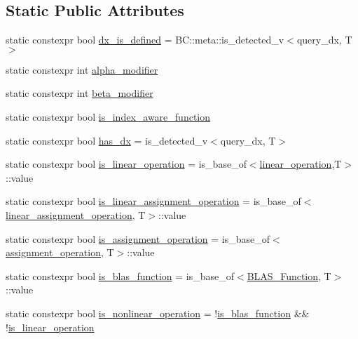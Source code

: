 \subsection*{Static Public Attributes}
\begin{DoxyCompactItemize}
\item 
static constexpr bool \hyperlink{structBC_1_1oper_1_1operation__traits_a6e6485639213a9e1ea200b332d7cfa1e}{dx\+\_\+is\+\_\+defined} = B\+C\+::meta\+::is\+\_\+detected\+\_\+v$<$query\+\_\+dx, T$>$
\item 
static constexpr int \hyperlink{structBC_1_1oper_1_1operation__traits_a5be5e94a332aa91190ca0f6d4d439eed}{alpha\+\_\+modifier}
\item 
static constexpr int \hyperlink{structBC_1_1oper_1_1operation__traits_a0599e3b95b772ecf1119ace0f6e7731a}{beta\+\_\+modifier}
\item 
static constexpr bool \hyperlink{structBC_1_1oper_1_1operation__traits_a4cbbac5d3e310a2ee631b565645ea850}{is\+\_\+index\+\_\+aware\+\_\+function}
\item 
static constexpr bool \hyperlink{structBC_1_1oper_1_1operation__traits_abc3cbcf7ca150885b496cb05f67947b9}{has\+\_\+dx} = is\+\_\+detected\+\_\+v$<$query\+\_\+dx, T$>$
\item 
static constexpr bool \hyperlink{structBC_1_1oper_1_1operation__traits_adae4b22fd29b6ec139a618448722c079}{is\+\_\+linear\+\_\+operation} = is\+\_\+base\+\_\+of$<$\hyperlink{structBC_1_1oper_1_1linear__operation}{linear\+\_\+operation},T$>$\+::value
\item 
static constexpr bool \hyperlink{structBC_1_1oper_1_1operation__traits_a87a889313432e09fde4493f622e9875d}{is\+\_\+linear\+\_\+assignment\+\_\+operation} = is\+\_\+base\+\_\+of$<$\hyperlink{structBC_1_1oper_1_1linear__assignment__operation}{linear\+\_\+assignment\+\_\+operation}, T$>$\+::value
\item 
static constexpr bool \hyperlink{structBC_1_1oper_1_1operation__traits_a34a6f667b82f184311447df43428cbda}{is\+\_\+assignment\+\_\+operation} = is\+\_\+base\+\_\+of$<$\hyperlink{structBC_1_1oper_1_1assignment__operation}{assignment\+\_\+operation}, T$>$\+::value
\item 
static constexpr bool \hyperlink{structBC_1_1oper_1_1operation__traits_afda2219c317e3396f38f2664ad14013a}{is\+\_\+blas\+\_\+function} = is\+\_\+base\+\_\+of$<$\hyperlink{structBC_1_1oper_1_1BLAS__Function}{B\+L\+A\+S\+\_\+\+Function}, T$>$\+::value
\item 
static constexpr bool \hyperlink{structBC_1_1oper_1_1operation__traits_ad34eaf715b8d853ffe778bacd670ab4c}{is\+\_\+nonlinear\+\_\+operation} = !\hyperlink{structBC_1_1oper_1_1operation__traits_afda2219c317e3396f38f2664ad14013a}{is\+\_\+blas\+\_\+function} \&\& !\hyperlink{structBC_1_1oper_1_1operation__traits_adae4b22fd29b6ec139a618448722c079}{is\+\_\+linear\+\_\+operation}
\end{DoxyCompactItemize}


